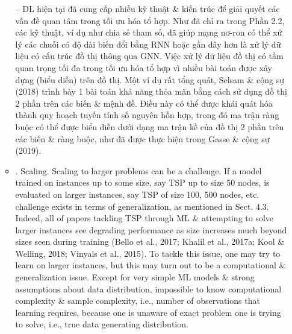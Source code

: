 \documentclass{article}
\begin{document}
\begin{itemize}
\begin{itemize}
        -- DL hiện tại đã cung cấp nhiều kỹ thuật \& kiến trúc để giải quyết các vấn đề quan tâm trong tối ưu hóa tổ hợp. Như đã chỉ ra trong Phần 2.2, các kỹ thuật, ví dụ như chia sẻ tham số, đã giúp mạng nơ-ron có thể xử lý các chuỗi có độ dài biến đổi bằng RNN hoặc gần đây hơn là xử lý dữ liệu có cấu trúc đồ thị thông qua GNN. Việc xử lý dữ liệu đồ thị có tầm quan trọng tối đa trong tối ưu hóa tổ hợp vì nhiều bài toán được xây dựng (biểu diễn) trên đồ thị. Một ví dụ rất tổng quát, Selsam \& cộng sự (2018) trình bày 1 bài toán khả năng thỏa mãn bằng cách sử dụng đồ thị 2 phần trên các biến \& mệnh đề. Điều này có thể được khái quát hóa thành quy hoạch tuyến tính số nguyên hỗn hợp, trong đó ma trận ràng buộc có thể được biểu diễn dưới dạng ma trận kề của đồ thị 2 phần trên các biến \& ràng buộc, như đã được thực hiện trong Gasse \& cộng sự (2019).
        \item {. Scaling.} Scaling to larger problems can be a challenge. If a model trained on instances up to some size, say TSP up to size 50 nodes, is evaluated on larger instances, say TSP of size 100, 500 nodes, etc. challenge exists in terms of generalization, as mentioned in Sect. 4.3. Indeed, all of papers tackling TSP through ML \& attempting to solve larger instances see degrading performance as size increases much beyond sizes seen during training (Bello et al., 2017; Khalil et al., 2017a; Kool \& Welling, 2018; Vinyals et al., 2015). To tackle this issue, one may try to learn on larger instances, but this may turn out to be a computational \& generalization issue. Except for very simple ML models \& strong assumptions about data distribution, impossible to know computational complexity \& sample complexity, i.e., number of observations that learning requires, because one is unaware of exact problem one is trying to solve, i.e., true data generating distribution.


\end{itemize}
\end{itemize}
\end{document}
